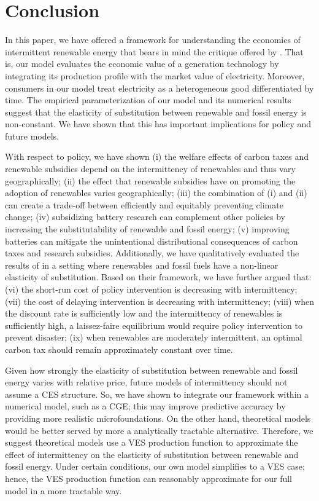 \documentclass[11pt,a4paper,leqno]{extarticle}
\begin{document}
	
	
	\section{Conclusion}
	
	
	In this paper, we have offered a framework for understanding the economics of intermittent renewable energy that bears in mind the critique offered by \citet{Joskow2011}. That is, our model evaluates the economic value of a generation technology by integrating its production profile with the market value of electricity. Moreover, consumers in our model treat electricity as a heterogeneous good differentiated by time. The empirical parameterization of our model and its numerical results suggest that the elasticity of substitution between renewable and fossil energy is non-constant. We have shown that this has important implications for policy and future models. 
	
	With respect to policy, we have shown (i) the welfare effects of carbon taxes and renewable subsidies depend on the intermittency of renewables and thus vary geographically; (ii) the effect that renewable subsidies have on promoting the adoption of renewables varies geographically; (iii) the combination of (i) and (ii) can create a trade-off between efficiently and equitably preventing climate change; (iv) subsidizing battery research can complement other policies by increasing the substitutability of renewable and fossil energy; (v) improving batteries can mitigate the unintentional distributional consequences of carbon taxes and research subsidies.  Additionally, we have qualitatively evaluated the results of \citet{Ace2012} in a setting where renewables and fossil fuels have a non-linear elasticity of substitution. Based on their framework, we have further argued that: (vi) the short-run cost of policy intervention is decreasing with intermittency;  (vii) the cost of delaying intervention is decreasing with intermittency; (viii) when the discount rate is sufficiently low and the intermittency of renewables is sufficiently high, a laissez-faire equilibrium would require policy intervention to prevent disaster; (ix) when renewables are moderately intermittent, an optimal carbon tax should remain approximately constant over time. 
	
	Given how strongly the elasticity of substitution between renewable and fossil energy varies with relative price, future models of intermittency should not assume a CES structure. So, we have shown to integrate our framework within a numerical model, such as a CGE; this may improve predictive accuracy by providing more realistic microfoundations. On the other hand, theoretical models would be better served by more a analytically tractable alternative. Therefore, we suggest theoretical models use a VES production function to approximate the effect of intermittency on the elasticity of substitution between renewable and fossil energy. Under certain conditions, our own model simplifies to a VES case; hence, the VES production function can reasonably approximate for our full model in a more tractable way. 
	
\end{document}
